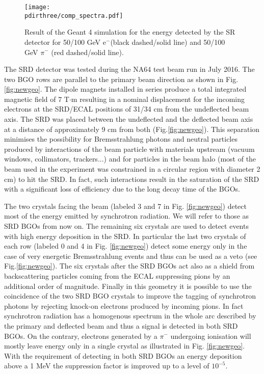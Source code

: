 \begin{figure}[htb!]
\centering
\texttt{[image: \\pdirthree/comp\_spectra.pdf]}
\caption[SR spectrum for different energy detected in the SRD]{Result of the Geant 4 simulation for the energy detected by the SR detector for 50/100 GeV e$^-$(black dashed/solid line) and 50/100 GeV $\pi^-$ (red dashed/solid line).}
\label{fig:SRspectrum}
\end{figure}

The SRD detector was tested during the NA64 test beam run in July 2016. The two BGO rows are parallel to the primary beam direction as shown in Fig.\ref{fig:newgeo}. The dipole magnets installed in series produce a total integrated magnetic field of 7 T$\cdot$m \cite{Banerjee:2016tad} resulting in a nominal displacement for the incoming electrons at the SRD/ECAL positions of 31/34 cm from the undeflected beam axis. The SRD was placed between the undeflected and the deflected beam axis at a distance of approximately 9 cm from both (Fig.\ref{fig:newgeo}). This separation minimises the possibility for Bremsstrahlung photons and neutral particles produced by interactions of the beam particle with materials upstream (vacuum windows, collimators, trackers...) and for particles in the beam halo (most of the beam used in the experiment was constrained in a circular region with diameter 2 cm) to hit the SRD. In fact, such interactions result in the saturation of the SRD with a significant loss of efficiency due to the long decay time of the BGOs.


The two crystals facing the beam (labeled 3 and 7 in Fig. \ref{fig:newgeo}) detect most of the energy emitted by synchrotron radiation. We will refer to those as SRD BGOs from now on. The remaining six crystals are used to detect events with high energy deposition in the SRD. In particular the last two crystals of each row (labeled 0 and 4 in Fig. \ref{fig:newgeo}) detect some energy only in the case of very energetic Bremsstrahlung events and thus can be used as a veto (see Fig.\ref{fig:newgeo}). The six crystals after the SRD BGOs act also as a shield from backscattering particles coming from the ECAL suppressing pions by an additional order of magnitude. Finally in this geometry it is possible to use the coincidence of the two SRD BGO crystals to improve the tagging of synchrotron photons by rejecting knock-on electrons produced by incoming pions. In fact synchrotron radiation has a homogenous spectrum in the whole arc described by the primary and deflected beam and thus a signal is detected in both SRD BGOs. On the contrary, electrons generated by a $\pi^-$ undergoing ionisation will mostly leave energy only in a single crystal as illustrated in Fig. \ref{fig:newgeo}. 
With the requirement of detecting in both SRD BGOs an energy deposition above a 1 MeV the suppression factor is improved up to a level of $10^{-5}$.



